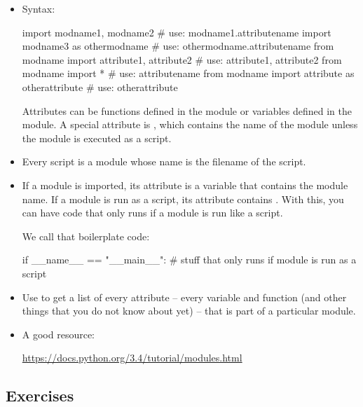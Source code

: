 \documentclass[11pt]{cselabheader}
\begin{document}
{\begin{itemize}
  \item Syntax:

    \begin{python3code}
import modname1, modname2 # use: modname1.attributename
import modname3 as othermodname # use: othermodname.attributename
from modname import attribute1, attribute2 # use: attribute1, attribute2
from modname import * # use: attributename
from modname import attribute as otherattribute # use: otherattribute
    \end{python3code}

    Attributes can be functions defined in the module or variables defined in
    the module. A special attribute is , which contains
    the name of the module unless the module is executed as a script.

  \item Every script is a module whose name is the filename of the script.

  \item If a module is imported, its  attribute is a
    variable that contains the module name. If a module is run as a script, its
     attribute contains . With
    this, you can have code that only runs if a module is run like a script.

    We call that boilerplate code:

    \begin{python3code}
if __name__ == "__main__":
    # stuff that only runs if module is run as a script
    \end{python3code}

  \item Use  to get a list of every attribute -- every
    variable and function (and other things that you do not know about yet) --
    that is part of a particular module.

  \item A good resource:

    \begin{center}
\url{https://docs.python.org/3.4/tutorial/modules.html}
    \end{center}
\end{itemize}

\subsection{Exercises}
\label{subsec:modules.ex}

}
\end{document}
